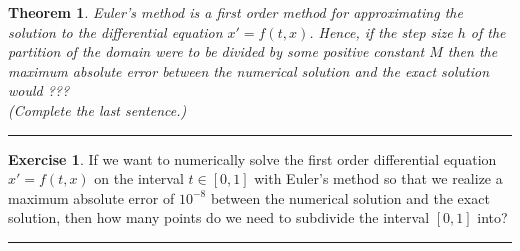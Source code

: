 \documentclass[
]{book}
\newtheorem{theorem}{Theorem}[chapter]
\theoremstyle{definition}
\theoremstyle{definition}
\theoremstyle{definition}
\newtheorem{exercise}{Exercise}[chapter]
\theoremstyle{remark}
\begin{document}
\begin{theorem}
\protect\hypertarget{thm:unnamed-chunk-430}{}{\label{thm:unnamed-chunk-430} }Euler's method is a first order method for approximating the solution to the differential equation \(x' = f(t,x)\). Hence, if the step size \(h\) of the partition of the domain were to be divided by some positive constant \(M\) then the maximum absolute error between the numerical solution and the exact solution would ???\\
(Complete the last sentence.)
\end{theorem}

\begin{center}\rule{0.5\linewidth}{0.5pt}\end{center}

\begin{exercise}
\protect\hypertarget{exr:unnamed-chunk-431}{}{\label{exr:unnamed-chunk-431} }If we want to numerically solve the first order differential equation \(x' = f(t,x)\) on the interval \(t \in [0,1]\) with Euler's method so that we realize a maximum absolute error of \(10^{-8}\) between the numerical solution and the exact solution, then how many points do we need to subdivide the interval \([0,1]\) into?
\end{exercise}

\begin{center}\rule{0.5\linewidth}{0.5pt}\end{center}
\end{document}
